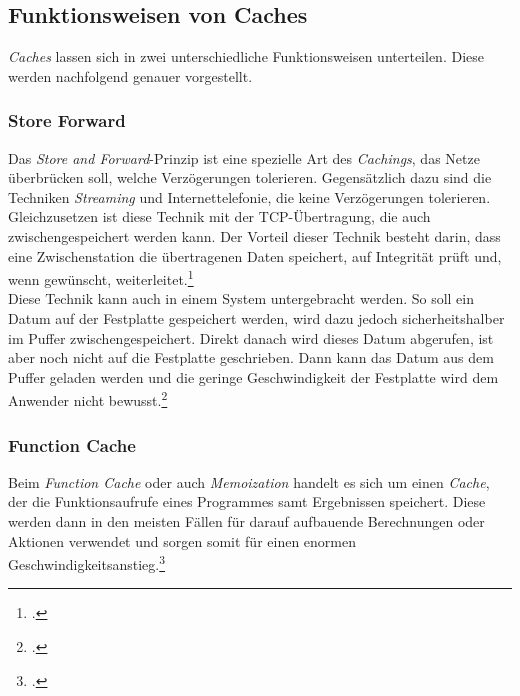 \subsection{Funktionsweisen von Caches}
\label{ssec:cache-funktionsweisen}
\textit{Caches} lassen sich in zwei unterschiedliche Funktionsweisen unterteilen. Diese werden nachfolgend genauer vorgestellt.

\subsubsection*{Store Forward}
\label{sssec:cache-store-forward}
Das \textit{Store and Forward}-Prinzip ist eine spezielle Art des \textit{Cachings}, das Netze überbrücken soll, welche Verzögerungen tolerieren. Gegensätzlich dazu sind die Techniken \textit{Streaming} und Internettelefonie, die keine Verzögerungen tolerieren. Gleichzusetzen ist diese Technik mit der \ac{TCP}-Übertragung, die auch zwischengespeichert werden kann. Der Vorteil dieser Technik besteht darin, dass eine Zwischenstation die übertragenen Daten speichert, auf Integrität prüft und, wenn gewünscht, weiterleitet.\footcite{Cache-StoreForward}\\
Diese Technik kann auch in einem System untergebracht werden. So soll ein Datum auf der Festplatte gespeichert werden, wird dazu jedoch sicherheitshalber im Puffer zwischengespeichert. Direkt danach wird dieses Datum abgerufen, ist aber noch nicht auf die Festplatte geschrieben. Dann kann das Datum aus dem Puffer geladen werden und die geringe Geschwindigkeit der Festplatte wird dem Anwender nicht bewusst.\footcite{Cache-StoreForwardSOA}

\subsubsection*{Function Cache}
\label{sssec:cache-function-cache}
Beim \textit{Function Cache} oder auch \textit{Memoization} handelt es sich um einen \textit{Cache}, der die Funktionsaufrufe eines Programmes samt Ergebnissen speichert. Diese werden dann in den meisten Fällen für darauf aufbauende Berechnungen oder Aktionen verwendet und sorgen somit für einen enormen Geschwindigkeitsanstieg.\footcite{Cache-Memoization}


